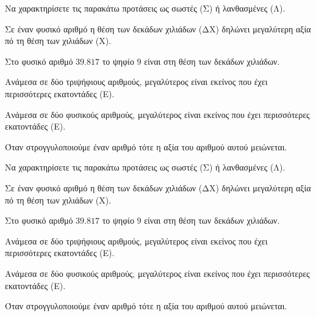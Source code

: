 Να χαρακτηρίσετε τις παρακάτω προτάσεις ως σωστές (Σ) ή λανθασμένες (Λ).
\begin{rlist}
\item Σε έναν φυσικό αριθμό η θέση των δεκάδων χιλιάδων (ΔΧ) δηλώνει μεγαλύτερη αξία πό τη θέση των χιλιάδων (Χ).
\item Στο φυσικό αριθμό $ 39.817 $ το ψηφίο $ 9 $ είναι στη θέση των δεκάδων χιλιάδων.
\item Ανάμεσα σε δύο τριψήφιους αριθμούς, μεγαλύτερος είναι εκείνος που έχει περισσότερες εκατοντάδες (Ε).
\item Ανάμεσα σε δύο φυσικούς αριθμούς, μεγαλύτερος είναι εκείνος που έχει περισσότερες εκατοντάδες (Ε).
\item Όταν στρογγυλοποιούμε έναν αριθμό τότε η αξία του αριθμού αυτού μειώνεται.
\end{rlist}
Να χαρακτηρίσετε τις παρακάτω προτάσεις ως σωστές (Σ) ή λανθασμένες (Λ).
\begin{rlist}
\item Σε έναν φυσικό αριθμό η θέση των δεκάδων χιλιάδων (ΔΧ) δηλώνει μεγαλύτερη αξία πό τη θέση των χιλιάδων (Χ).
\item Στο φυσικό αριθμό $ 39.817 $ το ψηφίο $ 9 $ είναι στη θέση των δεκάδων χιλιάδων.
\item Ανάμεσα σε δύο τριψήφιους αριθμούς, μεγαλύτερος είναι εκείνος που έχει περισσότερες εκατοντάδες (Ε).
\item Ανάμεσα σε δύο φυσικούς αριθμούς, μεγαλύτερος είναι εκείνος που έχει περισσότερες εκατοντάδες (Ε).
\item Όταν στρογγυλοποιούμε έναν αριθμό τότε η αξία του αριθμού αυτού μειώνεται.
\end{rlist}
